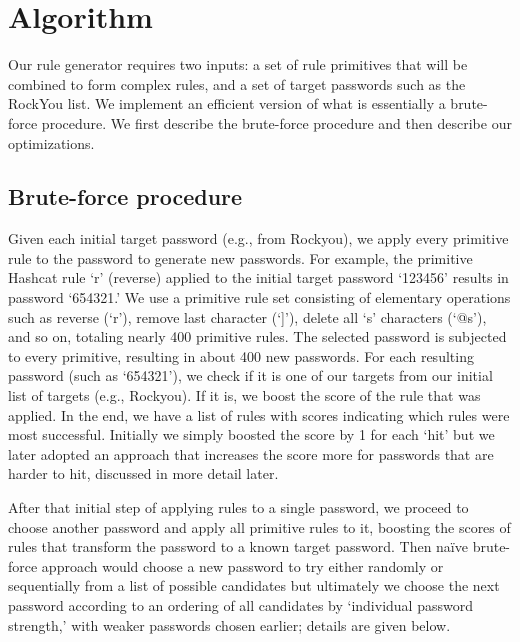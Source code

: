 \documentclass[letterpaper,twocolumn,10pt]{article}
\begin{document}


\section{Algorithm}
\label{sec:algorithm}

Our rule generator requires two inputs: a set of rule primitives that will be
combined to form complex rules, and a set of target passwords such as the
RockYou list. We implement an efficient version of what is essentially a
brute-force procedure. We first describe the brute-force procedure and then
describe our optimizations.


\subsection{Brute-force procedure}

Given each initial target password (e.g., from Rockyou), we apply every
primitive rule to the password to generate new passwords. For example, the
primitive Hashcat rule `r' (reverse) applied to the initial target password
`123456' results in password `654321.' We use a primitive rule set consisting
of elementary operations such as reverse (`r'), remove last character (`]'),
delete all `s' characters (`@s'), and so on, totaling nearly 400 primitive
rules. The selected password is subjected to every primitive, resulting in about
400 new passwords. For each resulting password (such as `654321'), we check if
it is one of our targets from our initial list of targets (e.g., Rockyou). If it
is, we boost the score of the rule that was applied. In the end, we have a list
of rules with scores indicating which rules were most successful. Initially
we simply boosted the score by 1 for each `hit' but we later adopted an
approach that increases the score more for passwords that are harder to hit,
discussed in more detail later.

After that initial step of applying rules to a single password, we proceed to
choose another password and apply all primitive rules to it, boosting the
scores of rules that transform the password to a known target password. Then
naïve brute-force approach would choose a new password to try either randomly
or sequentially from a list of possible candidates but ultimately we
choose the next password according to an ordering of all candidates by
`individual password strength,' with weaker passwords chosen earlier; details
are given below.
\end{document}
